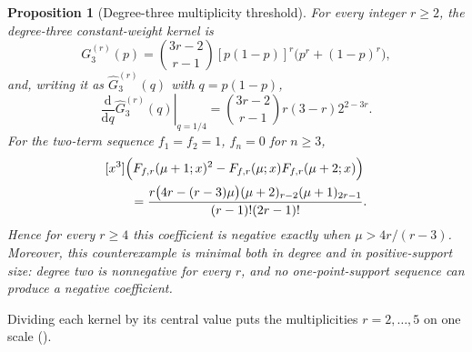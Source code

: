 \documentclass[11pt,a4paper]{amsart}
\numberwithin{equation}{section}
\theoremstyle{plain}
\newtheorem{proposition}[theorem]{Proposition}
\theoremstyle{definition}
\begin{document}
\begin{proposition}[Degree-three multiplicity threshold]
\label{prop:multiplicity-threshold}
For every integer \(r\ge2\), the degree-three constant-weight kernel is
\[
 G^{(r)}_3(p)
 =\binom{3r-2}{r-1}[p(1-p)]^r\bigl(p^r+(1-p)^r\bigr),
\]
and, writing it as \(\widehat G^{(r)}_3(q)\) with \(q=p(1-p)\),
\begin{equation}\label{eq:r-central-slope}
 \left.\frac{\mathrm d}{\mathrm d q}\widehat G^{(r)}_3(q)\right|_{q=1/4}
 =\binom{3r-2}{r-1}r(3-r)2^{2-3r}.
\end{equation}
For the two-term sequence \(f_1=f_2=1\), \(f_n=0\) for \(n\ge3\),
\begin{equation}\label{eq:r-degree-three}
 \begin{split}
 &[x^3]\Bigl(
 F_{f,r}(\mu+1;x)^2-F_{f,r}(\mu;x)F_{f,r}(\mu+2;x)\Bigr)\\
 &\qquad=
 \frac{r\bigl(4r-(r-3)\mu\bigr)
 (\mu+2)_{r-2}(\mu+1)_{2r-1}}
 {(r-1)!(2r-1)!}.
 \end{split}
\end{equation}
Hence for every \(r\ge4\) this coefficient is negative exactly when
\(\mu>4r/(r-3)\).  Moreover, this counterexample is minimal both in degree and
in positive-support size: degree two is nonnegative for every \(r\), and no
one-point-support sequence can produce a negative coefficient.
\end{proposition}

Dividing each kernel by its central value puts the multiplicities
\(r=2,\dots,5\) on one scale ().
\end{document}
